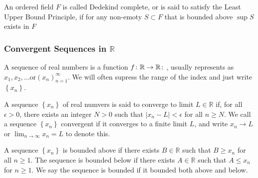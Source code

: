 \documentclass{article}
\begin{document}
\begin{definition}
	An ordered field \( F \) is called Dedekind complete, or is said to satisfy the Least Upper Bound Principle, if for any non-emoty \( S \subset  F \) that is bounded above \( \sup{S} \) exists in \( F \)
\end{definition}

\subsubsection*{Convergent Sequences in \( \mathbb{R} \)}
\begin{definition}
	A sequence of real numbers is a function \( f \colon  \mathbb{R} \to \mathbb{R} \colon  \), usually represents as \( x_{1}, x_{2}, \ldots \text{or} (x_n)_{n=1}^{\infty} \). We will often supress the range of the index and just write \( \left\{ x_{n} \right\}  \).
\end{definition}

\begin{definition}
	A sequence \( \left\{ x_{n} \right\}  \) of real numvers is said to converge to limit \( L \in  \mathbb{R} \) if, for all \( \epsilon > 0 \), there exists an integer \( N > 0 \) such that \( \left| x_n - L \right|  < \epsilon \) for all \( n \ge N \). We call a sequence \( \left\{ x_n \right\}  \) convergent if it converges to a finite limit \( L \), and write \( x_{n} \to L \) or \( \lim_{n \to \infty} x_n = L \) to denote this.
\end{definition}

\begin{definition}
	A sequence \( \left\{ x_n \right\}  \) is bounded above if there exists \( B \in  \mathbb{R} \) such that \( B\ge x_n \) for all \( n \ge 1 \). The sequence is bounded below if there exists \( A \in \mathbb{R} \) such that \( A \le x_{n} \) for \( n \ge 1 \). We say the sequence is bounded if it bounded both above and below.
\end{definition}
\end{document}
